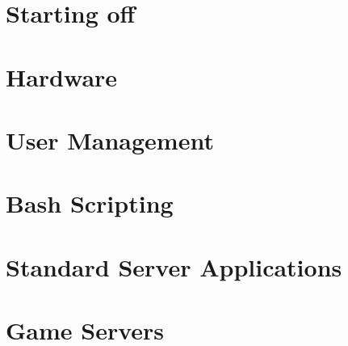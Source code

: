 \documentclass[11pt, a4paper, final]{report}
\begin{document}

%
\part{Starting off}







\part{Hardware}
\label{part:hardware}


\part{User Management}


\part{Bash Scripting}


\part{Standard Server Applications}






%





\part{Game Servers}



\end{document}
